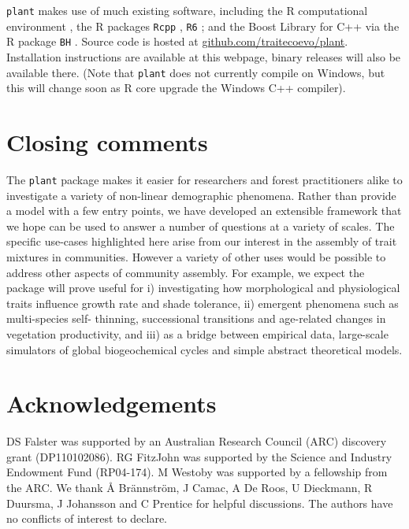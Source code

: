 \documentclass[a4paper,11pt]{article}
\newcommand{\plant}{\texttt{plant}}
\begin{document}
{\plant} makes use of much existing software, including the R
computational environment \citep{R-2015}, the R packages \texttt{Rcpp}
\citep{Eddelbuettel-2011, Eddelbuettel-2013}, \texttt{R6}
\citep{Chang-2014}; and the Boost Library for C++
\citep{Schaling-2014} via the R package \texttt{BH}
\citep{Eddelbuettel-2015}. Source code is hosted at
\href{https://github.com/traitecoevo/plant}{github.com/traitecoevo/plant}.
Installation instructions are available at this webpage, binary
releases will also be available there.  (Note that {\plant} does not
currently compile on Windows, but this will change soon as R core
upgrade the Windows C++ compiler).

\section{Closing comments}

The {\plant} package makes it easier for researchers and forest
practitioners alike to investigate a variety of non-linear demographic
phenomena.  Rather than provide a model with a few entry points, we
have developed an extensible framework that we hope can be used to
answer a number of questions at a variety of scales. The specific
use-cases highlighted here arise from our interest in the assembly of
trait mixtures in communities. However a variety of other uses would
be possible to address other aspects of community assembly. For
example, we expect the package will prove useful for i) investigating
how morphological and physiological traits influence growth rate and
shade tolerance, ii) emergent phenomena such as multi-species self-
thinning, successional transitions and age-related changes in
vegetation productivity, and iii) as a bridge between empirical data,
large-scale simulators of global biogeochemical cycles and simple
abstract theoretical models.

\section{Acknowledgements}

DS Falster was supported by an Australian Research Council (ARC)
discovery grant (DP110102086). RG FitzJohn was supported by the
Science and Industry Endowment Fund (RP04-174). M Westoby was
supported by a fellowship from the ARC. We thank {\AA}
Br{\"a}nnstr{\"o}m, J Camac, A De Roos, U Dieckmann, R Duursma, J
Johansson and C Prentice for helpful discussions. The authors have no 
conflicts of interest to declare.
\end{document}
